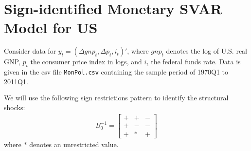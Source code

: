 \documentclass{article}
\begin{document}
\newpage

\section[Sign-identified Monetary SVAR Model for US]{Sign-identified Monetary SVAR Model for US\label{ex:SignIdentifiedMonetarySVARUS}}
Consider data for \(y_t = (\Delta gnp_t,\Delta p_t,i_t)'\),
  where \(gnp_t\) denotes the log of U.S. real GNP,
  \(p_t\) the consumer price index in logs,
  and \(i_t\) the federal funds rate.
  Data is given in the csv file \texttt{MonPol.csv} containing the sample period of 1970Q1 to 2011Q1.

We will use the following sign restrictions pattern to identify the structural shocks:
\begin{align}
B_0^{-1}=\begin{bmatrix}
	+ & + & -\\
	+ & - & -\\
	+ & *  & +
	\label{eq:signpattern}
\end{bmatrix}
\end{align}
where \(*\) denotes an unrestricted value.
\end{document}
